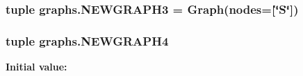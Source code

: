 \hypertarget{namespacegraphs_aedb230b38d5f073048723436245bef7d}{}
\subsubsection[{N\+E\+W\+G\+R\+A\+P\+H3}]{\setlength{\rightskip}{0pt plus 5cm}tuple graphs.\+N\+E\+W\+G\+R\+A\+P\+H3 = {\bf Graph}(nodes=\mbox{[}\char`\"{}S\char`\"{}\mbox{]})}\label{namespacegraphs_aedb230b38d5f073048723436245bef7d}
\hypertarget{namespacegraphs_a45b53eabbf4f285b22b4caa5e3376bd9}{}
\subsubsection[{N\+E\+W\+G\+R\+A\+P\+H4}]{\setlength{\rightskip}{0pt plus 5cm}tuple graphs.\+N\+E\+W\+G\+R\+A\+P\+H4}\label{namespacegraphs_a45b53eabbf4f285b22b4caa5e3376bd9}
{\bfseries Initial value\+:}
